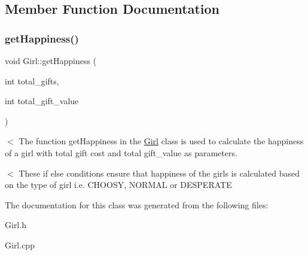 \subsection{Member Function Documentation}
\mbox{\label{class_girl_a8844d2de1392d0cdcc5e201bc319a026}} 
\subsubsection{\texorpdfstring{get\+Happiness()}{getHappiness()}}
{\footnotesize\ttfamily void Girl\+::get\+Happiness (\begin{DoxyParamCaption}\item[{int}]{total\+\_\+gifts,  }\item[{int}]{total\+\_\+gift\+\_\+value }\end{DoxyParamCaption})}



$<$ The function get\+Happiness in the \hyperlink{class_girl}{Girl} class is used to calculate the happiness of a girl with total gift cost and total gift\+\_\+value as parameters. 

$<$ These if else conditions ensure that happiness of the girls is calculated based on the type of girl i.\+e. C\+H\+O\+O\+SY, N\+O\+R\+M\+AL or D\+E\+S\+P\+E\+R\+A\+TE 

The documentation for this class was generated from the following files\+:\begin{DoxyCompactItemize}
\item 
Girl.\+h\item 
Girl.\+cpp\end{DoxyCompactItemize}
